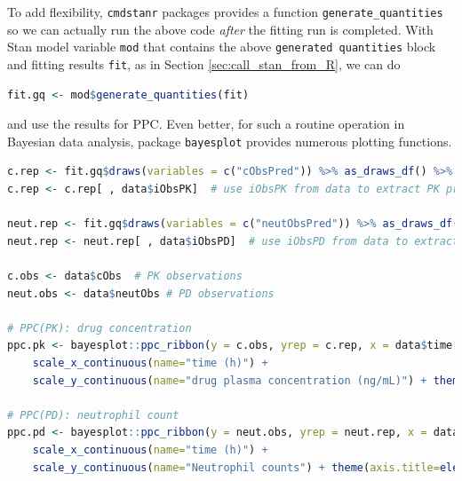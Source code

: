 To add flexibility, \texttt{cmdstanr} packages provides a function
\texttt{generate\_quantities} so we can actually run the above code
\emph{after} the fitting run is completed. With
Stan model variable \texttt{mod} that contains the above \texttt{generated quantities}
block and fitting results \texttt{fit}, as in Section \ref{sec:call_stan_from_R},
we can do
\begin{lstlisting}[language=R, numbers=none]
fit.gq <- mod$generate_quantities(fit)
\end{lstlisting}
and use the results for PPC.
Even better, for such a routine operation in Bayesian data analysis, package \texttt{bayesplot}
provides numerous plotting functions.
\begin{lstlisting}[language=R, numbers=none]
c.rep <- fit.gq$draws(variables = c("cObsPred")) %>% as_draws_df() %>% as.matrix()
c.rep <- c.rep[ , data$iObsPK]  # use iObsPK from data to extract PK predictions corresponding to observation time

neut.rep <- fit.gq$draws(variables = c("neutObsPred")) %>% as_draws_df() %>% as.matrix()
neut.rep <- neut.rep[ , data$iObsPD]  # use iObsPD from data to extract PD predictions corresponding to observation time

c.obs <- data$cObs  # PK observations
neut.obs <- data$neutObs # PD observations

# PPC(PK): drug concentration
ppc.pk <- bayesplot::ppc_ribbon(y = c.obs, yrep = c.rep, x = data$time[data$iObsPK]) +
    scale_x_continuous(name="time (h)") +
    scale_y_continuous(name="drug plasma concentration (ng/mL)") + theme(axis.title=element_text(size=20),axis.text=element_text(size=20),legend.text=element_text(size=20))

# PPC(PD): neutrophil count
ppc.pd <- bayesplot::ppc_ribbon(y = neut.obs, yrep = neut.rep, x = data$time[data$iObsPD]) +
    scale_x_continuous(name="time (h)") +
    scale_y_continuous(name="Neutrophil counts") + theme(axis.title=element_text(size=20),axis.text=element_text(size=20),legend.text=element_text(size=20))
\end{lstlisting}

